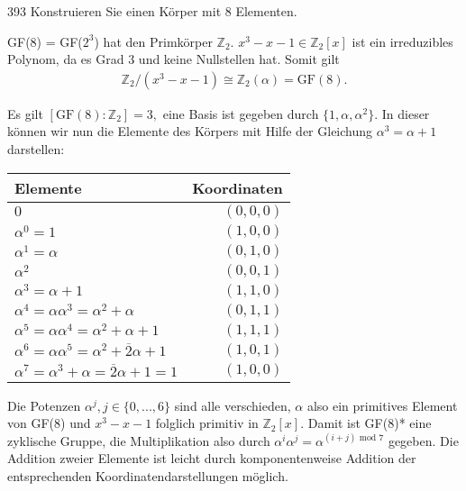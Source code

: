 \begin{algebraUE}{393}
  Konstruieren Sie einen Körper mit 8 Elementen.
\end{algebraUE}

\begin{solution}

  GF(8) = GF($2^3$) hat den Primkörper $\mathbb{Z}_2.$ $x^3-x-1 \in \mathbb{Z}_2[x]$ ist ein irreduzibles Polynom, da es Grad 3 und keine Nullstellen hat. Somit gilt
  \begin{align*}
      \mathbb{Z}_2/(x^3-x-1) \cong \mathbb{Z}_2(\alpha) = \text{GF}(8).
  \end{align*}

  Es gilt $[\text{GF}(8) : \mathbb{Z}_2] = 3,$ eine Basis ist gegeben durch $\{1, \alpha, \alpha^2\}.$ In dieser können wir nun die Elemente des Körpers
  mit Hilfe der Gleichung $\alpha^3 = \alpha + 1$ darstellen:
  \begin{center}
  \begin{tabular}[h]{l|r}
  Elemente & Koordinaten \\
  \hline
  $0$ & $(0, 0, 0)$ \\
  $\alpha^0 = 1$ & $(1, 0, 0)$ \\
  $\alpha^1 = \alpha$ & $(0, 1, 0)$ \\
  $\alpha^2$ & $(0, 0, 1)$ \\
  $\alpha^3 = \alpha + 1$ & $(1, 1, 0)$ \\
  $\alpha^4 = \alpha\alpha^3 = \alpha^2 + \alpha$ & $(0, 1, 1)$ \\
  $\alpha^5 = \alpha\alpha^4 = \alpha^2 + \alpha + 1$ & $(1, 1, 1)$ \\
  $\alpha^6 = \alpha\alpha^5 = \alpha^2 + \overline2\alpha + 1$ & $(1, 0, 1)$ \\
  $\alpha^7 = \alpha^3 + \alpha = \overline2\alpha + 1 = 1$ & $(1, 0, 0)$
  \end{tabular}
  \end{center}

  Die Potenzen $\alpha^j, j \in \{0, ..., 6\}$ sind alle verschieden, $\alpha$ also ein primitives Element von GF(8) und $x^3 - x - 1$ folglich primitiv in $\mathbb{Z}_2[x].$ Damit ist GF(8)* eine zyklische Gruppe, die Multiplikation also durch $\alpha^i \alpha^j = \alpha^{(i+j) \text{~mod~} 7}$ gegeben. Die Addition zweier Elemente ist leicht durch komponentenweise Addition der entsprechenden Koordinatendarstellungen möglich.

\end{solution}
